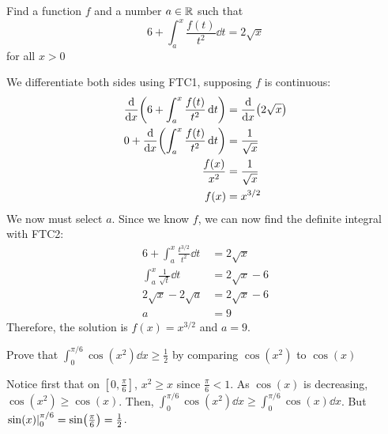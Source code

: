 \documentclass{agony}
\begin{document}
\begin{prob}
  Find a function $f$ and a number $a\in\mathbb{R}$ such that
  \[ 6+\int_a^x \frac{f(t)}{t^2}\dd{t} = 2\sqrt{x} \]
  for all $x > 0$
\end{prob}
\begin{sol}
  We differentiate both sides using FTC1, supposing $f$ is continuous:
  \begin{align*}
    \dv{x}(6+\int_a^x \frac{f(t)}{t^2}\dd{t}) & = \dv{x}(2\sqrt{x})  \\
    0+\dv{x}(\int_a^x \frac{f(t)}{t^2}\dd{t}) & = \frac{1}{\sqrt{x}} \\
    \frac{f(x)}{x^2}                          & = \frac{1}{\sqrt{x}} \\
    f(x)                                      & = x^{3/2}
  \end{align*}
  We now must select $a$.
  Since we know $f$, we can now find the definite integral with FTC2:
  \begin{align*}
    6+\int_a^x \frac{t^{3/2}}{t^2}\dd{t} & = 2\sqrt{x}     \\
    \int_a^x \frac{1}{\sqrt{t}} \dd{t}   & = 2\sqrt{x} - 6 \\
    2\sqrt{x} - 2\sqrt{a}                & = 2\sqrt{x} - 6 \\
    a                                    & = 9
  \end{align*}
  Therefore, the solution is $f(x) = x^{3/2}$ and $a=9$.
\end{sol}

\begin{prob}
  Prove that $\displaystyle\int_0^{\pi/6}\cos(x^2)\dd{x} \geq \frac{1}{2}$
  by comparing $\cos(x^2)$ to $\cos(x)$
\end{prob}
\begin{sol}
  Notice first that on $[0,\frac\pi6]$, $x^2 \geq x$ since $\frac\pi6 < 1$.
  As $\cos(x)$ is decreasing, $\cos(x^2) \geq \cos(x)$.
  Then, $\int_0^{\pi/6} \cos(x^2) \dd{x} \geq \int_0^{\pi/6} \cos(x) \dd{x}$.
  But $\left.\sin(x)\right|_{0}^{\pi/6} = \sin(\frac\pi6) = \frac12$.
\end{sol}
\end{document}
